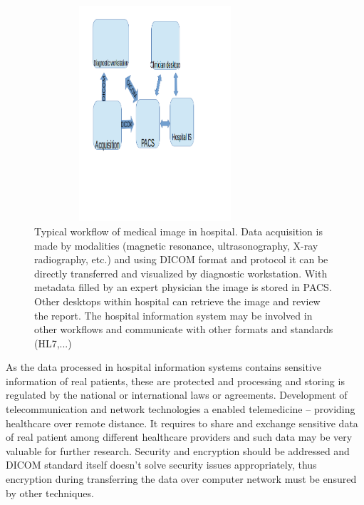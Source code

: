 \begin{figure}[ht]
    \centering
    \includegraphics[width=0.8\textwidth, height=8cm]{chapter4/pacs.png}
    \caption{Typical workflow of medical image in hospital. Data acquisition is made by modalities (magnetic resonance, ultrasonography, X-ray radiography, etc.) and using DICOM format and protocol it can be directly transferred and visualized by diagnostic workstation. With metadata filled by an expert physician the image is stored in PACS. Other desktops within hospital can retrieve the image and review the report. The hospital information system may be involved in other workflows and communicate with other formats and standards (HL7,...)
    }
    \label{fig:pacs}
\end{figure}

As the data processed in hospital information systems contains sensitive information of real patients, these are protected and processing and storing is regulated by the national or international laws or agreements.
Development of telecommunication and network technologies a enabled telemedicine -- providing healthcare over remote distance. It requires to share and exchange  sensitive data of real patient among different healthcare providers and such data may be very valuable for further research. Security and encryption should be addressed and DICOM standard itself doesn't solve security issues appropriately, thus encryption during transferring the data over computer network must be ensured by other techniques.


